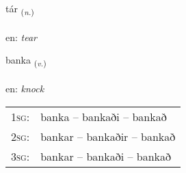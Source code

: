 \documentclass[frontgrid, backgrid]{flacards}\usepackage[]{graphicx}\usepackage[]{xcolor}
\begin{document}
\renewcommand{\blhead}{\vskip5pt {\small\bfseries\footnotesize Nafnorð | Noun }}
\renewcommand{\bcfoot}{\vskip5pt \hspace{2pt}{\small\bfseries\footnotesize 3K}}


{tár \small{\textsubscript{(\textit{n.})}} \\[1ex] %
\textphonetic{[tʰauːr]} \\
en: \emph{tear} \\  [2ex]
\renewcommand*{\arraystretch}{0.8}
}

\renewcommand{\flhead}{\vskip5pt \fboxsep=0pt {\small\bfseries\footnotesize Sagnorð | Verb}}
\renewcommand{\fcfoot}{\vskip5pt \fboxsep=0pt \hspace{2pt}{\small\bfseries\footnotesize 3K}}

\renewcommand{\blhead}{\vskip5pt {\small\bfseries\footnotesize Sagnorð | Verb }}
\renewcommand{\bcfoot}{\vskip5pt \hspace{2pt}{\small\bfseries\footnotesize 3K}}


{banka \small{\textsubscript{(\textit{v.})}} \\[1ex] %
\textphonetic{[pauŋ̥ka]} \\
en: \emph{knock} \\  [2ex]
\renewcommand*{\arraystretch}{0.8}
\begin{tabular}{p{1cm}l}
\textsc{1sg}: & banka -- bankaði -- bankað \\ 
\textsc{2sg}: & bankar -- bankaðir -- bankað \\ 
\textsc{3sg}: & bankar -- bankaði -- bankað \\ 
\end{tabular}
}

\renewcommand{\flhead}{\vskip5pt \fboxsep=0pt {\small\bfseries\footnotesize Lýsingarorð | Adjective}}
\renewcommand{\fcfoot}{\vskip5pt \fboxsep=0pt \hspace{2pt}{\small\bfseries\footnotesize 3K}}
\end{document}
